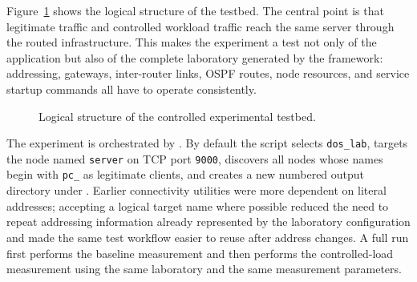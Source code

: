 Figure~\ref{fig:dos-testbed} shows the logical structure of the testbed. The
central point is that legitimate traffic and controlled workload traffic reach
the same server through the routed infrastructure. This makes the experiment a
test not only of the application but also of the complete laboratory generated
by the framework: addressing, gateways, inter-router links, OSPF routes, node
resources, and service startup commands all have to operate consistently.

\begin{figure}[htbp]
\centering
{}
\caption{Logical structure of the controlled experimental testbed.}
\label{fig:dos-testbed}
\end{figure}

The experiment is orchestrated by . By default the script
selects \texttt{dos\_lab}, targets the node named \texttt{server} on TCP port
\texttt{9000}, discovers all nodes whose names begin with \texttt{pc\_} as
legitimate clients, and creates a new numbered output directory under
. Earlier connectivity utilities were more dependent on
literal addresses; accepting a logical target name where possible reduced the
need to repeat addressing information already represented by the laboratory
configuration and made the same test workflow easier to reuse after address
changes. A full run first performs the baseline measurement and then performs
the controlled-load measurement using the same laboratory and the same
measurement parameters.

